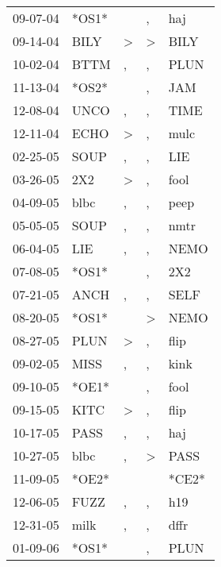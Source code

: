 \begin{supertabular}{lllll}
 09-07-04 &  *OS1* &                  &                , &    haj \\
 09-14-04 &   BILY &     \textgreater &     \textgreater &   BILY \\
 10-02-04 &   BTTM &                , &                , &   PLUN \\
 11-13-04 &  *OS2* &                  &                , &    JAM \\
 12-08-04 &   UNCO &                , &                , &   TIME \\
 12-11-04 &   ECHO &     \textgreater &                , &   mulc \\
 02-25-05 &   SOUP &                , &                , &    LIE \\
 03-26-05 &    2X2 &     \textgreater &                , &   fool \\
 04-09-05 &   blbc &                , &                , &   peep \\
 05-05-05 &   SOUP &                , &                , &   nmtr \\
 06-04-05 &    LIE &                , &                , &   NEMO \\
 07-08-05 &  *OS1* &                  &                , &    2X2 \\
 07-21-05 &   ANCH &                , &                , &   SELF \\
 08-20-05 &  *OS1* &                  &     \textgreater &   NEMO \\
 08-27-05 &   PLUN &     \textgreater &                , &   flip \\
 09-02-05 &   MISS &                , &                , &   kink \\
 09-10-05 &  *OE1* &                  &                , &   fool \\
 09-15-05 &   KITC &     \textgreater &                , &   flip \\
 10-17-05 &   PASS &                , &                , &    haj \\
 10-27-05 &   blbc &                , &     \textgreater &   PASS \\
 11-09-05 &  *OE2* &                  &                  &  *CE2* \\
 12-06-05 &   FUZZ &                , &                , &    h19 \\
 12-31-05 &   milk &                , &                , &   dffr \\
 01-09-06 &  *OS1* &                  &                , &   PLUN \\

\end{supertabular}
